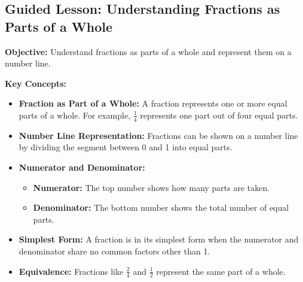 \documentclass[12pt]{article}
\title{}
\date{}
\begin{document}
\subsection*{Guided Lesson: Understanding Fractions as Parts of a Whole}
\onehalfspacing

\begin{tcolorbox}[colframe=black!40, colback=gray!5, 
coltitle=black, colbacktitle=black!20, fonttitle=\bfseries\Large, 
title=Learning Objective, halign title=center, left=5pt, right=5pt, top=5pt, bottom=15pt]
\textbf{Objective:} Understand fractions as parts of a whole and represent them on a number line.
\end{tcolorbox}

\vspace{1em}

\begin{tcolorbox}[colframe=black!60, colback=white, 
coltitle=black, colbacktitle=black!15, fonttitle=\bfseries\Large, 
title=Key Concepts and Vocabulary, halign title=center, left=10pt, right=10pt, top=10pt, bottom=15pt]
\textbf{Key Concepts:}
\begin{itemize}
    \item \textbf{Fraction as Part of a Whole:} A fraction represents one or more equal parts of a whole. For example, \( \frac{1}{4} \) represents one part out of four equal parts.
    \item \textbf{Number Line Representation:} Fractions can be shown on a number line by dividing the segment between 0 and 1 into equal parts.
    \item \textbf{Numerator and Denominator:}
    \begin{itemize}
        \item \textbf{Numerator:} The top number shows how many parts are taken.
        \item \textbf{Denominator:} The bottom number shows the total number of equal parts.
    \end{itemize}
    \item \textbf{Simplest Form:} A fraction is in its simplest form when the numerator and denominator share no common factors other than 1.
    \item \textbf{Equivalence:} Fractions like \( \frac{2}{4} \) and \( \frac{1}{2} \) represent the same part of a whole.
\end{itemize}
\end{tcolorbox}

\vspace{1em}
\end{document}
